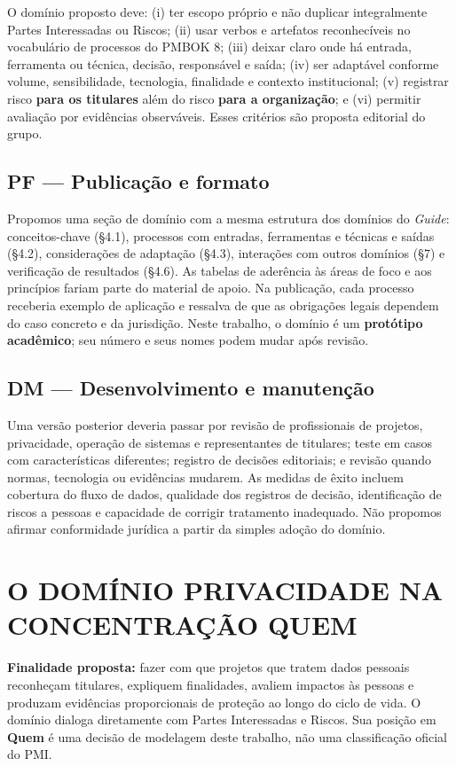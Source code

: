 \documentclass[12pt,a4paper,article,oneside,english,brazil]{abntex2}
\begin{document}
O domínio proposto deve: (i) ter escopo próprio e não duplicar integralmente Partes Interessadas ou Riscos; (ii) usar verbos e artefatos reconhecíveis no vocabulário de processos do PMBOK 8; (iii) deixar claro onde há entrada, ferramenta ou técnica, decisão, responsável e saída; (iv) ser adaptável conforme volume, sensibilidade, tecnologia, finalidade e contexto institucional; (v) registrar risco \textbf{para os titulares} além do risco \textbf{para a organização}; e (vi) permitir avaliação por evidências observáveis. Esses critérios são proposta editorial do grupo.
\subsection{PF — Publicação e formato}

Propomos uma seção de domínio com a mesma estrutura dos domínios do \textit{Guide}: conceitos-chave (§4.1), processos com entradas, ferramentas e técnicas e saídas (§4.2), considerações de adaptação (§4.3), interações com outros domínios (§7) e verificação de resultados (§4.6). As tabelas de aderência às áreas de foco e aos princípios fariam parte do material de apoio. Na publicação, cada processo receberia exemplo de aplicação e ressalva de que as obrigações legais dependem do caso concreto e da jurisdição. Neste trabalho, o domínio é um \textbf{protótipo acadêmico}; seu número e seus nomes podem mudar após revisão.
\subsection{DM — Desenvolvimento e manutenção}

Uma versão posterior deveria passar por revisão de profissionais de projetos, privacidade, operação de sistemas e representantes de titulares; teste em casos com características diferentes; registro de decisões editoriais; e revisão quando normas, tecnologia ou evidências mudarem. As medidas de êxito incluem cobertura do fluxo de dados, qualidade dos registros de decisão, identificação de riscos a pessoas e capacidade de corrigir tratamento inadequado. Não propomos afirmar conformidade jurídica a partir da simples adoção do domínio.

\section{O DOMÍNIO PRIVACIDADE NA CONCENTRAÇÃO QUEM}

\textbf{Finalidade proposta:} fazer com que projetos que tratem dados pessoais reconheçam titulares, expliquem finalidades, avaliem impactos às pessoas e produzam evidências proporcionais de proteção ao longo do ciclo de vida. O domínio dialoga diretamente com Partes Interessadas e Riscos. Sua posição em \textbf{Quem} é uma decisão de modelagem deste trabalho, não uma classificação oficial do PMI.
\end{document}
